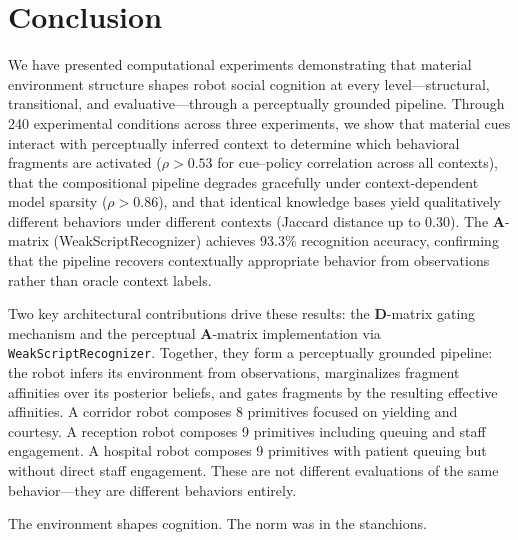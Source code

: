 \documentclass[11pt,a4paper]{article}
\newcommand{\A}{\mathbf{A}}
\newcommand{\D}{\mathbf{D}}
\begin{document}
\section{Conclusion}
\label{sec:conclusion}

We have presented computational experiments demonstrating that material environment structure shapes robot social cognition at every level---structural, transitional, and evaluative---through a perceptually grounded pipeline.  Through 240 experimental conditions across three experiments, we show that material cues interact with perceptually inferred context to determine which behavioral fragments are activated ($\rho > 0.53$ for cue--policy correlation across all contexts), that the compositional pipeline degrades gracefully under context-dependent model sparsity ($\rho > 0.86$), and that identical knowledge bases yield qualitatively different behaviors under different contexts (Jaccard distance up to 0.30).  The $\A$-matrix (WeakScriptRecognizer) achieves 93.3\% recognition accuracy, confirming that the pipeline recovers contextually appropriate behavior from observations rather than oracle context labels.

Two key architectural contributions drive these results: the $\D$-matrix gating mechanism and the perceptual $\A$-matrix implementation via \texttt{WeakScriptRecognizer}.  Together, they form a perceptually grounded pipeline: the robot infers its environment from observations, marginalizes fragment affinities over its posterior beliefs, and gates fragments by the resulting effective affinities.  A corridor robot composes 8 primitives focused on yielding and courtesy.  A reception robot composes 9 primitives including queuing and staff engagement.  A hospital robot composes 9 primitives with patient queuing but without direct staff engagement.  These are not different evaluations of the same behavior---they are different behaviors entirely.

The environment shapes cognition.  The norm was in the stanchions.




\end{document}
